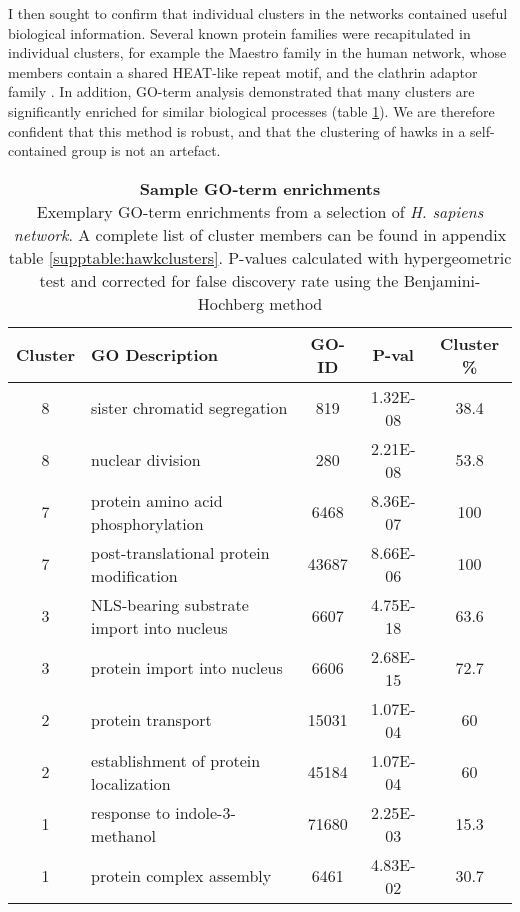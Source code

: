 \documentclass[a4paper,11pt,twoside,openright]{scrbook}
\begin{document}
I then sought to confirm that individual clusters in the networks contained useful biological information. Several known protein families were recapitulated in individual clusters, for example the Maestro family in the human network, whose members contain a shared HEAT-like repeat motif, and the clathrin adaptor family \cite{Smith2003a, McMahon2004}. In addition, GO-term analysis demonstrated that many clusters are significantly enriched for similar biological processes (table \ref{table:gohawks}). We are therefore confident that this method is robust, and that the clustering of hawks in a self-contained group is not an artefact.

\begin{table}[h]
    \caption[Sample GO-term enrichments]{\sffamily \textbf{Sample GO-term enrichments} \\ \small Exemplary GO-term enrichments from a selection of \textit{H. sapiens network}. A complete list of cluster members can be found in appendix table \ref{supptable:hawkclusters}. P-values calculated with hypergeometric test and corrected for false discovery rate using the Benjamini-Hochberg method \cite{Benjamini1995,Maere2005}}
    \centering
    \onehalfspacing
    \begin{tabular}{c l c c c}
    \hline
    Cluster & GO Description & GO-ID & P-val & Cluster \%\\[0.1cm]
    \hline
8 & sister chromatid segregation & 819 & 1.32E-08 & 38.4\\
8 & nuclear division & 280 & 2.21E-08 & 53.8\\
7 & protein amino acid phosphorylation & 6468 & 8.36E-07 & 100\\
7 & post-translational protein modification & 43687 & 8.66E-06 & 100\\
3 & NLS-bearing substrate import into nucleus & 6607 & 4.75E-18 & 63.6\\
3 & protein import into nucleus & 6606 & 2.68E-15 & 72.7\\
2 & protein transport & 15031 & 1.07E-04 & 60\\
2 & establishment of protein localization & 45184 & 1.07E-04 & 60\\
1 & response to indole-3-methanol & 71680 & 2.25E-03 & 15.3\\
1 & protein complex assembly & 6461 & 4.83E-02 & 30.7\\
[0.1cm]
    \hline
    \end{tabular}
    \label{table:gohawks}
\end{table}
\end{document}
